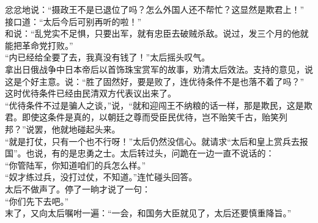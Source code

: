 忿忿地说：“摄政王不是已退位了吗？怎么外国人还不帮忙？这显然是欺君上！”\\

接口道：“太后今后可别再听的啦！”\\

和说：“乱党实不足惧，只要出军，就有忠臣去破贼杀敌。说过，发三个月的他就能把革命党打败。”\\

“内已经给全要了去，我真没有钱了！”太后摇头叹气。\\

拿出日俄战争中日本帝后以首饰珠宝赏军的故事，劝清太后效法。支持的意见，说这是个好主意。说：“胜了固然好，要是败了，连优待条件不是也落不着了吗？”\\

这时优待条件已经由民清双方代表议出来了。\\

“优待条件不过是骗人之谈，”说，“就和迎闯王不纳粮的话一样，那是欺民，这是欺君。即使这条件是真的，以朝廷之尊而受臣民优待，岂不贻笑千古，贻笑列邦？”说罢，他就地碰起头来。\\

“就是打仗，只有一个也不行呀！”太后仍然没信心。就请求“太后和皇上赏兵去报国”。也说，有的是忠勇之士。太后转过头，问跪在一边一直不说话的：\\

“你管陆军，你知道咱们的兵怎么样。”\\

“奴才练过兵，没打过仗，不知道。”连忙碰头回答。\\

太后不做声了。停了一晌才说了一句：\\

“你们先下去吧。”\\

末了，又向太后嘱咐一遍：“一会，和国务大臣就见了，太后还要慎重降旨。”\\

